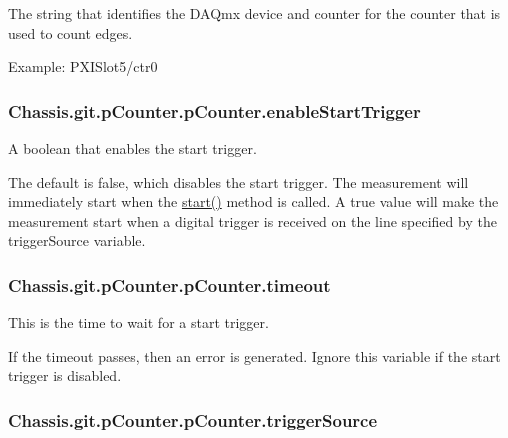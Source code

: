 The string that identifies the D\-A\-Qmx device and counter for the counter that is used to count edges. 

Example\-: P\-X\-I\-Slot5/ctr0 \hypertarget{class_chassis_8git_1_1p_counter_1_1p_counter_ac4e636f13e97b17017621f43e4d65c95}{
\subsubsection[{enable\-Start\-Trigger}]{\setlength{\rightskip}{0pt plus 5cm}Chassis.\-git.\-p\-Counter.\-p\-Counter.\-enable\-Start\-Trigger}}\label{class_chassis_8git_1_1p_counter_1_1p_counter_ac4e636f13e97b17017621f43e4d65c95}


A boolean that enables the start trigger. 

The default is false, which disables the start trigger. The measurement will immediately start when the \hyperlink{class_chassis_8git_1_1p_counter_1_1p_counter_a70605632a820fcbded267beb432fcdb4}{start()} method is called. A true value will make the measurement start when a digital trigger is received on the line specified by the trigger\-Source variable. \hypertarget{class_chassis_8git_1_1p_counter_1_1p_counter_ac2ada7a331b6be8cbd540485f0d90edd}{
\subsubsection[{timeout}]{\setlength{\rightskip}{0pt plus 5cm}Chassis.\-git.\-p\-Counter.\-p\-Counter.\-timeout}}\label{class_chassis_8git_1_1p_counter_1_1p_counter_ac2ada7a331b6be8cbd540485f0d90edd}


This is the time to wait for a start trigger. 

If the timeout passes, then an error is generated. Ignore this variable if the start trigger is disabled. \hypertarget{class_chassis_8git_1_1p_counter_1_1p_counter_a2308c1aa3a3c94cea864af076275b37a}{
\subsubsection[{trigger\-Source}]{\setlength{\rightskip}{0pt plus 5cm}Chassis.\-git.\-p\-Counter.\-p\-Counter.\-trigger\-Source}}\label{class_chassis_8git_1_1p_counter_1_1p_counter_a2308c1aa3a3c94cea864af076275b37a}


